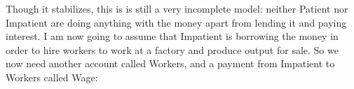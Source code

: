 Though it stabilizes, this is is still a very incomplete model: neither
Patient nor Impatient are doing anything with the money apart from
lending it and paying interest. I am now going to assume that Impatient
is borrowing the money in order to hire workers to work at a factory
and produce output for sale. So we now need another account called
Workers, and a payment from Impatient to Workers called Wage:


\begin{center}
\par\end{center}

